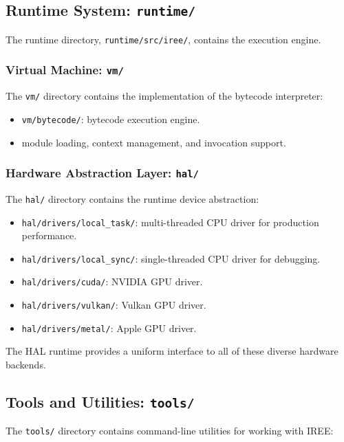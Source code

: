 \documentclass[11pt,a4paper]{article}
\begin{document}
\subsection{Runtime System: \texttt{runtime/}}

The runtime directory, \texttt{runtime/src/iree/}, contains the execution engine.

\subsubsection{Virtual Machine: \texttt{vm/}}

The \texttt{vm/} directory contains the implementation of the bytecode interpreter:

\begin{itemize}
    \item \texttt{vm/bytecode/}: bytecode execution engine.
    \item module loading, context management, and invocation support.
\end{itemize}

\subsubsection{Hardware Abstraction Layer: \texttt{hal/}}

The \texttt{hal/} directory contains the runtime device abstraction:

\begin{itemize}
    \item \texttt{hal/drivers/local\_task/}: multi-threaded CPU driver for production performance.
    \item \texttt{hal/drivers/local\_sync/}: single-threaded CPU driver for debugging.
    \item \texttt{hal/drivers/cuda/}: NVIDIA GPU driver.
    \item \texttt{hal/drivers/vulkan/}: Vulkan GPU driver.
    \item \texttt{hal/drivers/metal/}: Apple GPU driver.
\end{itemize}

The HAL runtime provides a uniform interface to all of these diverse hardware backends.

\subsection{Tools and Utilities: \texttt{tools/}}

The \texttt{tools/} directory contains command-line utilities for working with IREE:
\end{document}
